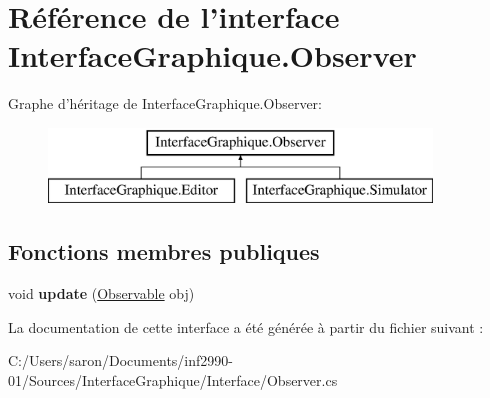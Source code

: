 \hypertarget{interface_interface_graphique_1_1_observer}{\section{Référence de l'interface Interface\-Graphique.\-Observer}
\label{interface_interface_graphique_1_1_observer}
}
Graphe d'héritage de Interface\-Graphique.\-Observer\-:\begin{figure}[H]
\begin{center}
\leavevmode
\includegraphics[height=2.000000cm]{interface_interface_graphique_1_1_observer}
\end{center}
\end{figure}
\subsection*{Fonctions membres publiques}
\begin{DoxyCompactItemize}
\item 
\hypertarget{interface_interface_graphique_1_1_observer_afe5d0ee48d0bf3eac59bcad98813376f}{void {\bfseries update} (\hyperlink{interface_interface_graphique_1_1_observable}{Observable} obj)}\label{interface_interface_graphique_1_1_observer_afe5d0ee48d0bf3eac59bcad98813376f}

\end{DoxyCompactItemize}


La documentation de cette interface a été générée à partir du fichier suivant \-:\begin{DoxyCompactItemize}
\item 
C\-:/\-Users/saron/\-Documents/inf2990-\/01/\-Sources/\-Interface\-Graphique/\-Interface/Observer.\-cs\end{DoxyCompactItemize}
